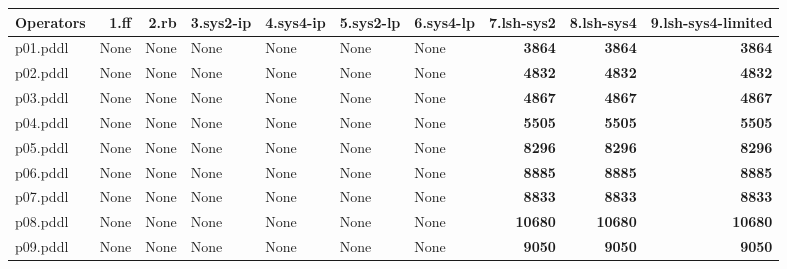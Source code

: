 \documentclass{article}
\begin{document}
\begin{tabular}{@{}lrrrrrrrrr@{}}
Operators & 1.ff & 2.rb & 3.sys2-ip & 4.sys4-ip & 5.sys2-lp & 6.sys4-lp & 7.lsh-sys2 & 8.lsh-sys4 & 9.lsh-sys4-limited \\
\midrule
p01.pddl & \multicolumn{1}{|l|}{None} & \multicolumn{1}{|l|}{None} & \multicolumn{1}{|l|}{None} & \multicolumn{1}{|l|}{None} & \multicolumn{1}{|l|}{None} & \multicolumn{1}{|l|}{None} & \textbf{3864} & \textbf{3864} & \textbf{3864} \\
p02.pddl & \multicolumn{1}{|l|}{None} & \multicolumn{1}{|l|}{None} & \multicolumn{1}{|l|}{None} & \multicolumn{1}{|l|}{None} & \multicolumn{1}{|l|}{None} & \multicolumn{1}{|l|}{None} & \textbf{4832} & \textbf{4832} & \textbf{4832} \\
p03.pddl & \multicolumn{1}{|l|}{None} & \multicolumn{1}{|l|}{None} & \multicolumn{1}{|l|}{None} & \multicolumn{1}{|l|}{None} & \multicolumn{1}{|l|}{None} & \multicolumn{1}{|l|}{None} & \textbf{4867} & \textbf{4867} & \textbf{4867} \\
p04.pddl & \multicolumn{1}{|l|}{None} & \multicolumn{1}{|l|}{None} & \multicolumn{1}{|l|}{None} & \multicolumn{1}{|l|}{None} & \multicolumn{1}{|l|}{None} & \multicolumn{1}{|l|}{None} & \textbf{5505} & \textbf{5505} & \textbf{5505} \\
p05.pddl & \multicolumn{1}{|l|}{None} & \multicolumn{1}{|l|}{None} & \multicolumn{1}{|l|}{None} & \multicolumn{1}{|l|}{None} & \multicolumn{1}{|l|}{None} & \multicolumn{1}{|l|}{None} & \textbf{8296} & \textbf{8296} & \textbf{8296} \\
p06.pddl & \multicolumn{1}{|l|}{None} & \multicolumn{1}{|l|}{None} & \multicolumn{1}{|l|}{None} & \multicolumn{1}{|l|}{None} & \multicolumn{1}{|l|}{None} & \multicolumn{1}{|l|}{None} & \textbf{8885} & \textbf{8885} & \textbf{8885} \\
p07.pddl & \multicolumn{1}{|l|}{None} & \multicolumn{1}{|l|}{None} & \multicolumn{1}{|l|}{None} & \multicolumn{1}{|l|}{None} & \multicolumn{1}{|l|}{None} & \multicolumn{1}{|l|}{None} & \textbf{8833} & \textbf{8833} & \textbf{8833} \\
p08.pddl & \multicolumn{1}{|l|}{None} & \multicolumn{1}{|l|}{None} & \multicolumn{1}{|l|}{None} & \multicolumn{1}{|l|}{None} & \multicolumn{1}{|l|}{None} & \multicolumn{1}{|l|}{None} & \textbf{10680} & \textbf{10680} & \textbf{10680} \\
p09.pddl & \multicolumn{1}{|l|}{None} & \multicolumn{1}{|l|}{None} & \multicolumn{1}{|l|}{None} & \multicolumn{1}{|l|}{None} & \multicolumn{1}{|l|}{None} & \multicolumn{1}{|l|}{None} & \textbf{9050} & \textbf{9050} & \textbf{9050} \\

\end{tabular}
\end{document}
